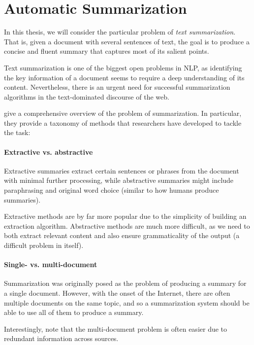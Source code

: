 \documentclass[12pt]{report}
\begin{document}
\section{Automatic Summarization}
\label{sec:taxonomy}

In this thesis, we will consider the particular problem of \emph{text summarization}.
That is, given a document with several sentences of text, the goal is to produce a concise and fluent summary that captures most of its salient points.

Text summarization is one of the biggest open problems in NLP, as identifying the key information of a document seems to require a deep understanding of its content. Nevertheless, there is an urgent need for successful summarization algorithms in the text-dominated discourse of the web.

\citet{Nenkova2011} give a comprehensive overview of the problem of summarization. In particular, they provide a taxonomy of methods that researchers have developed to tackle the task:

\paragraph{Extractive vs. abstractive} Extractive summaries extract certain sentences or phrases from the document with minimal further processing, while abstractive summaries might include paraphrasing and original word choice (similar to how humans produce summaries). 

Extractive methods are by far more popular due to the simplicity of building an extraction algorithm. Abstractive methods are much more difficult, as we need to both extract relevant content and also ensure grammaticality of the output (a difficult problem in itself).

\paragraph{Single- vs. multi-document} Summarization was originally posed as the problem of producing a summary for a single document. However, with the onset of the Internet, there are often multiple documents on the same topic, and so a summarization system should be able to use all of them to produce a summary.

Interestingly, \citet{Nenkova2011} note that the multi-document problem is often easier due to redundant information across sources. 

\end{document}
